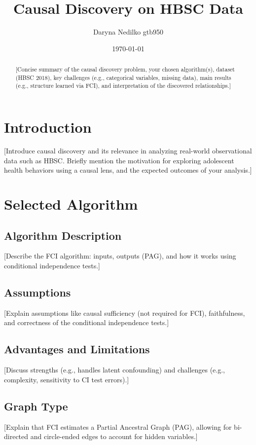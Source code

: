 \documentclass[a4paper]{article}
\title{Causal Discovery on HBSC Data}
\author{Daryna Nedilko gtb950}
\date{\today}
\begin{document}
\maketitle

\begin{abstract}
[Concise summary of the causal discovery problem, your chosen algorithm(s), dataset (HBSC 2018), key challenges (e.g., categorical variables, missing data), main results (e.g., structure learned via FCI), and interpretation of the discovered relationships.]
\end{abstract}

\section{Introduction}
\label{sec:introduction}

[Introduce causal discovery and its relevance in analyzing real-world observational data such as HBSC. Briefly mention the motivation for exploring adolescent health behaviors using a causal lens, and the expected outcomes of your analysis.]

\section{Selected Algorithm}
\label{sec:algorithm}

\subsection{Algorithm Description}
[Describe the FCI algorithm: inputs, outputs (PAG), and how it works using conditional independence tests.]

\subsection{Assumptions}
[Explain assumptions like causal sufficiency (not required for FCI), faithfulness, and correctness of the conditional independence tests.]

\subsection{Advantages and Limitations}
[Discuss strengths (e.g., handles latent confounding) and challenges (e.g., complexity, sensitivity to CI test errors).]

\subsection{Graph Type}
[Explain that FCI estimates a Partial Ancestral Graph (PAG), allowing for bi-directed and circle-ended edges to account for hidden variables.]
\end{document}
